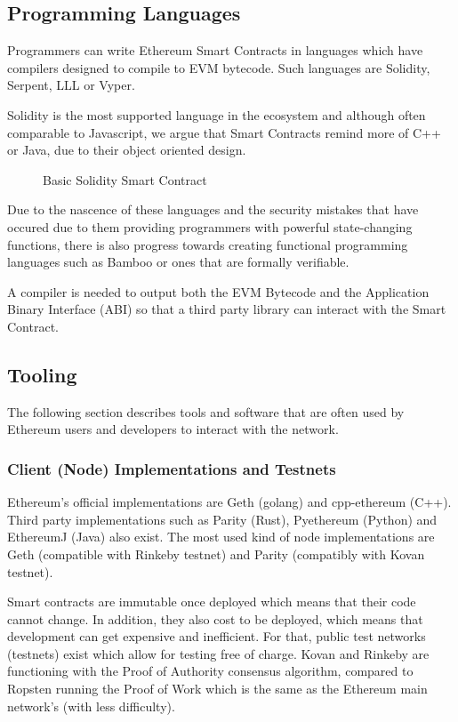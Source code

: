 \subsection{Programming Languages}
Programmers can write Ethereum Smart Contracts in languages which have compilers designed to compile to EVM bytecode. Such languages are Solidity, Serpent, LLL or Vyper. 

Solidity is the most supported language in the ecosystem and although often comparable to Javascript, we argue that Smart Contracts remind more of C++ or Java, due to their object oriented design. 

\begin{figure}[ht]
    \centering
    
    \caption{Basic Solidity Smart Contract}
    \label{smart_contract}
\end{figure}

Due to the nascence of these languages and the security mistakes that have occured due to them providing programmers with powerful state-changing functions, there is also progress towards creating functional programming languages such as Bamboo or ones that are formally verifiable.

A compiler is needed to output both the EVM Bytecode and the Application Binary Interface (ABI) so that a third party library can interact with the Smart Contract.


\subsection{Tooling}
The following section describes tools and software that are often used by Ethereum users and developers to interact with the network.
\subsubsection{Client (Node) Implementations and Testnets}
Ethereum's official implementations are Geth (golang) and cpp-ethereum (C++). Third party implementations such as Parity (Rust), Pyethereum (Python) and EthereumJ (Java) also exist. The most used kind of node implementations are Geth (compatible with Rinkeby testnet) and Parity (compatibly with Kovan testnet). 

Smart contracts are immutable once deployed which means that their code cannot change. In addition, they also cost to be deployed, which means that development can get expensive and inefficient. For that, public test networks (testnets) exist which allow for testing free of charge. Kovan and Rinkeby are functioning with the Proof of Authority \cite{poa} consensus algorithm, compared to Ropsten running the Proof of Work \cite{ethash} which is the same as the Ethereum main network's (with less difficulty). 

